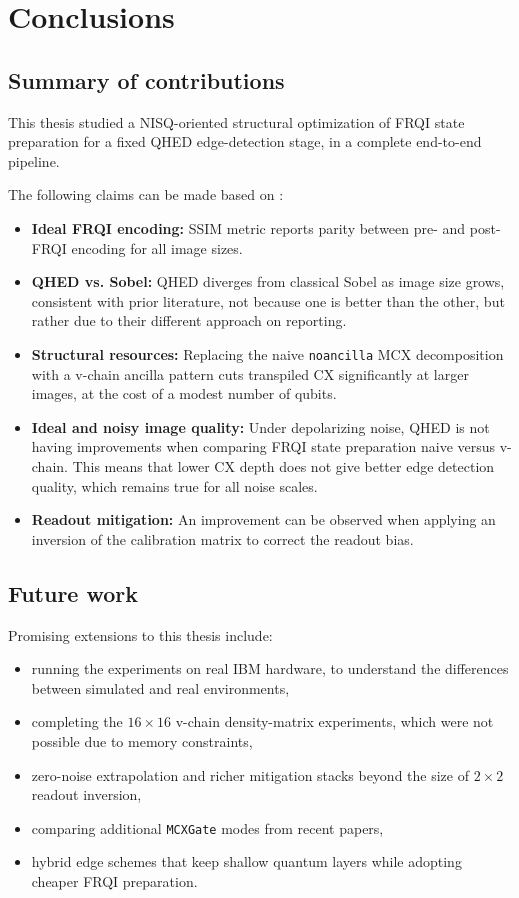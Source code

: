 \chapter{Conclusions}\label{ch:conclusions}
\thispagestyle{pagestyle}

\section{Summary of contributions}
This thesis studied a NISQ-oriented structural optimization of FRQI state preparation for a fixed QHED edge-detection stage, in a complete end-to-end pipeline.

The following claims can be made based on :

\begin{itemize}
  \item \textbf{Ideal FRQI encoding:} SSIM metric reports parity between pre- and post- FRQI encoding for all image sizes.
  \item \textbf{QHED vs. Sobel:} QHED diverges from classical Sobel as image size grows, consistent with prior literature, not because one is better than the other, but rather due to their different approach on reporting.
  \item \textbf{Structural resources:} Replacing the naive \texttt{noancilla} MCX decomposition with a v-chain ancilla pattern cuts transpiled CX significantly at larger images, at the cost of a modest number of qubits.
  \item \textbf{Ideal and noisy image quality:} Under depolarizing noise, QHED is not having improvements when comparing FRQI state preparation naive versus v-chain. This means that lower CX depth does not give better edge detection quality, which remains true for all noise scales.
  \item \textbf{Readout mitigation:} An improvement can be observed when applying an inversion of the calibration matrix to correct the readout bias.
\end{itemize}

\section{Future work}

Promising extensions to this thesis include:

\begin{itemize}
    \item running the experiments on real IBM hardware, to understand the differences between simulated and real environments,
    \item completing the $16\times 16$ v-chain density-matrix experiments, which were not possible due to memory constraints,
    \item zero-noise extrapolation and richer mitigation stacks beyond the size of $2\times 2$ readout inversion,
    \item comparing additional \texttt{MCXGate} modes from recent papers,
    \item hybrid edge schemes that keep shallow quantum layers while adopting cheaper FRQI preparation.
\end{itemize}